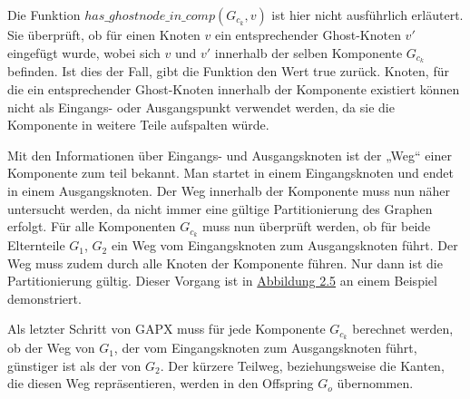 \begin{bem}
  Die Funktion $has\_ghostnode\_in\_comp(G_{c_k}, v)$ ist hier nicht
  ausführlich erläutert. Sie überprüft, ob für einen Knoten $v$ ein
  entsprechender Ghost-Knoten $v'$ eingefügt wurde, wobei sich $v$ und
  $v'$ innerhalb der selben Komponente $G_{c_k}$ befinden. Ist dies der Fall, gibt
  die Funktion den Wert true zurück. Knoten, für die ein entsprechender
  Ghost-Knoten innerhalb der Komponente existiert können nicht als
  Eingangs- oder Ausgangspunkt verwendet werden, da sie die Komponente
  in weitere Teile aufspalten würde.
\end{bem}
Mit den Informationen über Eingangs- und Ausgangsknoten ist der „Weg“ 
einer Komponente zum teil bekannt. Man startet in einem Eingangsknoten und endet
in einem Ausgangsknoten. Der Weg innerhalb der Komponente muss nun
näher untersucht werden, da nicht immer eine gültige Partitionierung des
Graphen erfolgt.
Für alle Komponenten $G_{c_k}$ muss nun überprüft werden,
ob für beide Elternteile $G_1$, $G_2$ ein Weg vom Eingangsknoten zum
Ausgangsknoten führt. Der Weg muss zudem durch alle Knoten der
Komponente führen. Nur dann ist die Partitionierung gültig. 
Dieser Vorgang ist in \hyperref[fig:entry_exit]{Abbildung 2.5} an einem Beispiel demonstriert.

Als letzter Schritt von GAPX muss für jede Komponente $G_{c_k}$ berechnet werden,
ob der Weg von $G_1$, der vom Eingangsknoten zum Ausgangsknoten führt,
günstiger ist als der von $G_2$. Der kürzere Teilweg, beziehungsweise die
Kanten, die diesen Weg repräsentieren, werden in den Offspring $G_o$
übernommen. 


